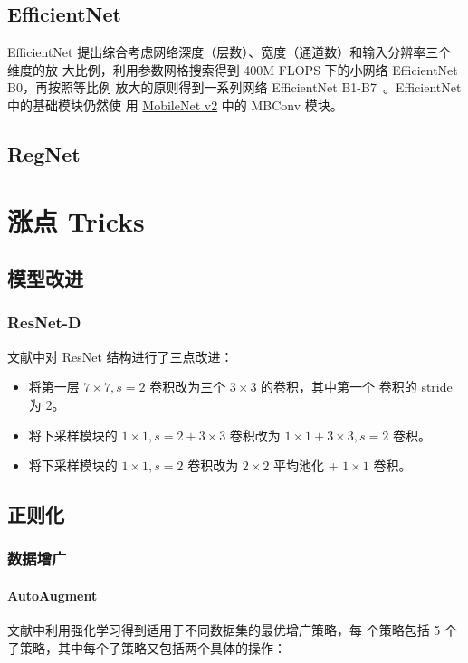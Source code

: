 \section{EfficientNet}
EfficientNet 提出综合考虑网络深度（层数）、宽度（通道数）和输入分辨率三个维度的放
大比例，利用参数网格搜索得到 400M FLOPS 下的小网络 EfficientNet B0，再按照等比例
放大的原则得到一系列网络 EfficientNet B1-B7~\cite{2019-EfficientNet}。EfficientNet中的基础模块仍然使
用 \hyperref[subsec:MobileNetv2]{MobileNet v2} 中的 MBConv 模块。

\section{RegNet}

\chapter{涨点 Tricks}
\section{模型改进}
\subsection{ResNet-D}
文献中对 ResNet 结构进行了三点改进：
\begin{itemize}
  \item 将第一层 $7 \times 7, s=2$ 卷积改为三个 $3 \times 3$ 的卷积，其中第一个
    卷积的 stride 为 2。
  \item 将下采样模块的 $1 \times 1, s=2 + 3 \times 3$ 卷积改为 $1 \times 1 + 3
    \times 3, s=2$ 卷积。
  \item 将下采样模块的 $1 \times 1, s=2$ 卷积改为 $2 \times 2$ 平均池化 + $1
    \times 1$ 卷积。
\end{itemize}

\section{正则化}
\subsection{数据增广}
\subsubsection{AutoAugment}
文献中利用强化学习得到适用于不同数据集的最优增广策略，每
个策略包括 5 个子策略，其中每个子策略又包括两个具体的操作：

